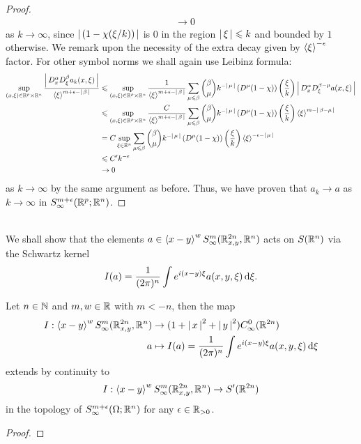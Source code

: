 \documentclass{article}
\begin{document}
\begin{proof}
\begin{align*}
    & \to 0
    \end{align*}
    as $k \to \infty$, since $\abs{( 1- \chi(\xi/ k))}$ is 0 in the region $\abs{\xi} \leq k$ and bounded by $1$ otherwise.  We remark upon the necessity of the extra decay given by $\sym[\xi]^{-\epsilon}$ factor. For other symbol norms we shall again use Leibinz formula: 
    \begin{align*}
    \sup_{(x, \xi) \in \R^p \times \R^n} \frac{\abs{D^\alpha_x D^\beta_\xi a_k(x, \xi)}}{\sym[\xi]^{m + \epsilon - \abs{\beta}}} 
    & \leq \sup_{(x, \xi) \in \R^p \times \R^n} \frac{1}{\sym[\xi]^{m + \epsilon - \abs{\beta}}} \sum_{\mu \leq \beta} \binom{\beta}{\mu}k^{-\abs{\mu}} \brac{D^\mu (1 - \chi)}\brac{\frac{\xi}{k}} \abs{D^\alpha_x D^{\beta - \mu}_\xi a(x, \xi) } \\
    & \leq  \sup_{(x, \xi) \in \R^p \times \R^n} \frac{C}{\sym[\xi]^{m + \epsilon - \abs{\beta}}} \sum_{\mu \leq \beta} \binom{\beta}{\mu}k^{-\abs{\mu}} \brac{D^\mu (1 - \chi)}\brac{\frac{\xi}{k}} \sym[\xi]^{m - \abs{\beta - \mu}}  \\
    & = C \sup_{\xi \in \R^n} \sum_{\mu \leq \beta} \binom{\beta}{\mu}k^{-\abs{\mu}} \brac{D^\mu (1 - \chi)}\brac{\frac{\xi}{k}} \sym[\xi]^{- \epsilon - \abs{\mu}}  \\
    & \leq C' k^{- \epsilon} \\
    & \to 0
    \end{align*}
    as $k \to \infty$ by the same argument as before. Thus, we have proven that $a_k \to a$ as $k \to \infty$ in $S^{m + \epsilon}_\infty(\R^p; \R^n)$. 
    
\end{proof}

\hfill \\ [3em]

We shall show that the elements $a \in \sym[x - y]^w S^{m}_\infty(\R^{2n}_{x,y}, \R^n) $ acts on $S(\R^n)$ via the Schwartz kernel 
\[
I(a) =  \frac{1}{(2\pi)^n} \int e^{i(x - y)\xi} a(x, y, \xi) \d[\xi]. 
\]
\begin{fprop}
    Let $n \in \N$ and $m, w \in \R$ with $m < -n$, then the map
    \begin{align*}
    I: \sym[x - y]^w S^{m}_\infty(\R^{2n}_{x,y}, \R^n) &\to (1 + \abs{x}^2 + \abs{y}^2) C^0_\infty(\R^{2n}) \\
    a &\mapsto I(a) = \frac{1}{(2\pi)^n} \int e^{i(x - y)\xi} a(x, y, \xi) \d[\xi]
    \end{align*}
    extends by continuity to 
    \begin{align*}
    I: \sym[x - y]^w S^{m}_\infty(\R^{2n}_{x,y}, \R^n) \to S'(\R^{2n})
    \end{align*}
    in the topology of $S^{m + \epsilon}_\infty(\Omega; \R^n)$ for any $\epsilon \in \R_{>0}$. 
\end{fprop}
\begin{proof}
    
\end{proof}
\end{document}
